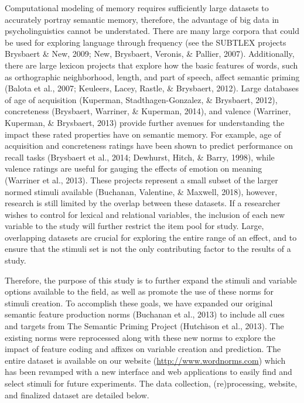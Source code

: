 \documentclass[english,man]{apa6}
\theoremstyle{definition}
\theoremstyle{definition}
\theoremstyle{definition}
\theoremstyle{remark}
\begin{document}
Computational modeling of memory requires sufficiently large datasets to
accurately portray semantic memory, therefore, the advantage of big data
in psycholinguistics cannot be understated. There are many large corpora
that could be used for exploring language through frequency (see the
SUBTLEX projects Brysbaert \& New, 2009; New, Brysbaert, Veronis, \&
Pallier, 2007). Additionally, there are large lexicon projects that
explore how the basic features of words, such as orthographic
neighborhood, length, and part of speech, affect semantic priming
(Balota et al., 2007; Keuleers, Lacey, Rastle, \& Brysbaert, 2012).
Large databases of age of acquisition (Kuperman, Stadthagen-Gonzalez, \&
Brysbaert, 2012), concreteness (Brysbaert, Warriner, \& Kuperman, 2014),
and valence (Warriner, Kuperman, \& Brysbaert, 2013) provide further
avenues for understanding the impact these rated properties have on
semantic memory. For example, age of acquisition and concreteness
ratings have been shown to predict performance on recall tasks
(Brysbaert et al., 2014; Dewhurst, Hitch, \& Barry, 1998), while valence
ratings are useful for gauging the effects of emotion on meaning
(Warriner et al., 2013). These projects represent a small subset of the
larger normed stimuli available (Buchanan, Valentine, \& Maxwell, 2018),
however, research is still limited by the overlap between these
datasets. If a researcher wishes to control for lexical and relational
variables, the inclusion of each new variable to the study will further
restrict the item pool for study. Large, overlapping datasets are
crucial for exploring the entire range of an effect, and to ensure that
the stimuli set is not the only contributing factor to the results of a
study.

Therefore, the purpose of this study is to further expand the stimuli
and variable options available to the field, as well as promote the use
of these norms for stimuli creation. To accomplish these goals, we have
expanded our original semantic feature production norms (Buchanan et
al., 2013) to include all cues and targets from The Semantic Priming
Project (Hutchison et al., 2013). The existing norms were reprocessed
along with these new norms to explore the impact of feature coding and
affixes on variable creation and prediction. The entire dataset is
available on our website (\url{http://www.wordnorms.com}) which has been
revamped with a new interface and web applications to easily find and
select stimuli for future experiments. The data collection,
(re)processing, website, and finalized dataset are detailed below.
\end{document}
